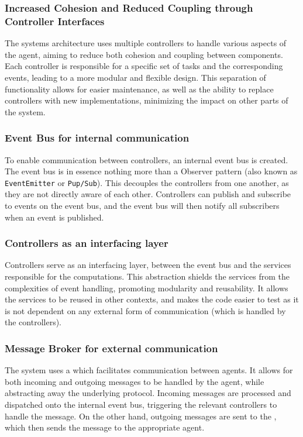 \subsubsection{Increased Cohesion and Reduced Coupling through Controller Interfaces}
\label{sssec:reduced-cohesion-coupling}
The systems architecture uses multiple controllers to handle various aspects of the agent, aiming to reduce both cohesion and coupling between components. Each controller is responsible for a specific set of tasks and the corresponding events, leading to a more modular and flexible design. This separation of functionality allows for easier maintenance, as well as the ability to replace controllers with new implementations, minimizing the impact on other parts of the system.

\subsubsection{Event Bus for internal communication}
\label{sssec:event-bus}
To enable communication between controllers, an internal event bus is created. The event bus is in essence nothing more than a Observer pattern (also known as \texttt{EventEmitter} or \texttt{Pup/Sub})\cite{gamma1995design}. This decouples the controllers from one another, as they are not directly aware of each other. Controllers can publish and subscribe to events on the event bus, and the event bus will then notify all subscribers when an event is published. 

\subsubsection{Controllers as an interfacing layer}
\label{sssec:controllers-interfacing-layer}
Controllers serve as an interfacing layer, between the event bus and the services responsible for the computations. This abstraction shields the services from the complexities of event handling, promoting modularity and reusability. It allows the services to be reused in other contexts, and makes the code easier to test as it is not dependent on any external form of communication (which is handled by the controllers).

\subsubsection{Message Broker for external communication}
\label{sssec:message-broker}
The system uses a  which facilitates communication between agents. It allows for both incoming and outgoing messages to be handled by the agent, while abstracting away the underlying protocol. Incoming messages are processed and dispatched onto the internal event bus, triggering the relevant controllers to handle the message. On the other hand, outgoing messages are sent to the , which then sends the message to the appropriate agent.

